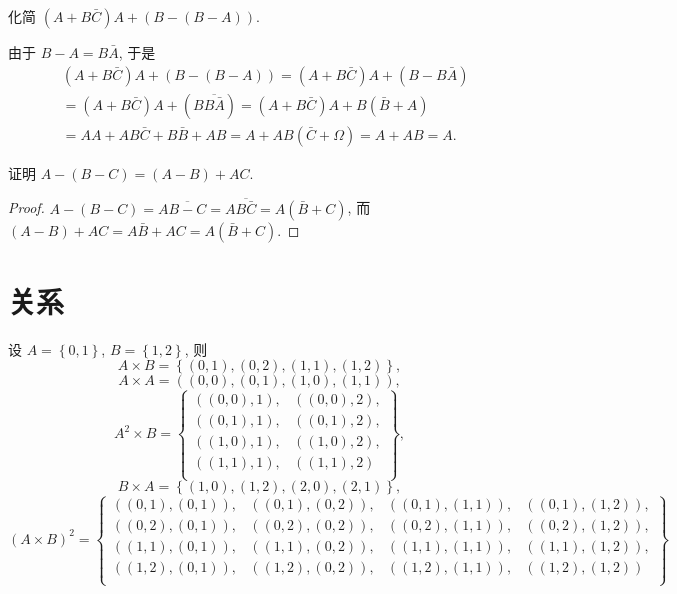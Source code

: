 \documentclass[10pt,UTF8]{book} %
\begin{document}
\begin{exercise}
    化简 $\left(A + B\bar C \right) A + (B - (B - A))$.
    \begin{sol}
        由于 $B - A = B\bar A$, 于是
        \[ 
        \begin{aligned}
            &\left(A + B\bar C \right) A + (B - (B - A))
            = \left(A + B\bar C \right) A + (B - B\bar A) \\
            &= \left(A + B\bar C \right) A + (B \overline{B \bar A})
            = \left(A + B\bar C \right) A + B (\bar B + A) \\
            &= AA + AB\bar C + B\bar B + AB
            = A + AB \left( \bar C + \varOmega \right)
            = A + AB = A.
        \end{aligned}\]
    \end{sol}
\end{exercise}

\begin{exercise}
    证明 $A - (B - C) = (A - B) + AC$.
    \begin{proof}
        $A - (B - C) = A \overline{B-C} = A \overline{B \bar C}
        = A \left( \bar B + C \right)$,
        而 $(A-B) + AC = A\bar B + AC = A \left( \bar B + C \right)$.
    \end{proof}
\end{exercise}

\chapter{关系}

\begin{exercise}
    设 $A = \left\{ 0,1 \right\}$, $B = \left\{ 1,2 \right\}$,
    则
    \[ A \times B = \left\{
        (0,1), (0,2), (1,1), (1,2)
    \right\}, \]
    \[ A \times A = \left(
        (0,0), (0,1), (1,0), (1,1)
    \right), \]
    \[ A^2 \times B = \left\{
        \begin{matrix}
            ((0,0), 1), & ((0,0), 2), \\ 
            ((0,1), 1), & ((0,1), 2), \\ 
            ((1,0), 1), & ((1,0), 2), \\ 
            ((1,1), 1), & ((1,1), 2) \\
        \end{matrix}
    \right\}, \]
    \[ B \times A = \left\{
        (1,0), (1,2),
        (2,0), (2,1)
    \right\}, \]
    \[ \left( A \times B \right)^2
    = \left\{ \begin{matrix}
        ((0,1), (0,1)), & ((0,1), (0,2)), & ((0,1), (1,1)), & ((0,1), (1,2)), \\
        ((0,2), (0,1)), & ((0,2), (0,2)), & ((0,2), (1,1)), & ((0,2), (1,2)), \\
        ((1,1), (0,1)), & ((1,1), (0,2)), & ((1,1), (1,1)), & ((1,1), (1,2)), \\
        ((1,2), (0,1)), & ((1,2), (0,2)), & ((1,2), (1,1)), & ((1,2), (1,2)) \\
    \end{matrix} \right\} \]
\end{exercise}
\end{document}
